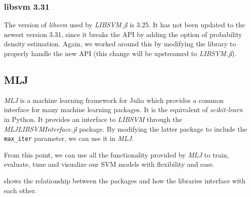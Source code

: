 \subsubsection{libsvm 3.31}

The version of \emph{libsvm} used by \emph{LIBSVM.jl} is 3.25. It has not been
updated to the newest version 3.31, since it breaks the API by adding the option
of probability density estimation. Again, we worked around this by modifying the
library to properly handle the new API (this change will be upstreamed to
\emph{LIBSVM.jl}). %

\subsection{MLJ}

\emph{MLJ} \cite{blaomMLJJuliaPackage2020} is a machine learning framework for
Julia which provides a common interface for many machine learning packages. It
is the equivalent of \emph{scikit-learn} in Python. It provides an interface to
\emph{LIBSVM} through the \emph{MLJLIBSVMInterface.jl} package. By modifying
the latter package to include the \texttt{max\_iter} parameter, we can use it in
\emph{MLJ}.

From this point, we can use all the functionality provided by \emph{MLJ} to
train, evaluate, tune and visualize our SVM models with flexibility and ease.

 shows the relationship between the packages and how
the libraries interface with each other.

